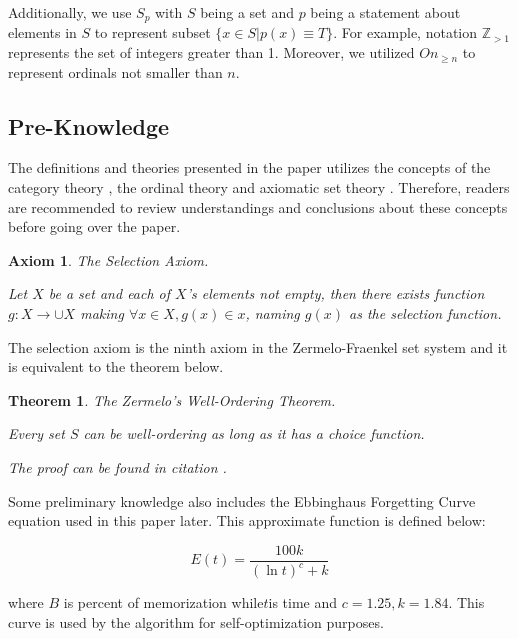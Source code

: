 \documentclass{aims}
\numberwithin{equation}{section}
\newtheorem{theorem}{Theorem}	%
\newtheorem{axiom}{Axiom}	%
\numberwithin{theorem}{section}	%
\numberwithin{axiom}{section}	%
\numberwithin{definition}{section}	%
\begin{document}
	Additionally, we use \(S_p\) with \(S\) being a set and \(p\) being a statement about elements in \(S\) to represent subset \(\{x\in S|p(x)\equiv T\}\). For example, notation \(\mathbb{Z}_{>1}\) represents the set of integers greater than 1. Moreover, we utilized \(On_{\geq n}\) to represent ordinals not smaller than \(n\).
	
	\subsection{Pre-Knowledge}
	
	The definitions and theories presented in the paper utilizes the concepts of the category theory \cite{Li2019}, the ordinal theory \cite{Li2019} and axiomatic set theory \cite{Li2019}. Therefore, readers are recommended to review understandings and conclusions about these concepts before going over the paper.
	
	\begin{axiom}
		The Selection Axiom.
		
		Let \(X\) be a set and each of \(X\){'}s elements not empty, then there exists function \(g:X\to \cup X\) making \(\forall x\in X,g(x)\in x\), naming \(g(x)\) as the selection function.
	\end{axiom}
	
	The selection axiom is the ninth axiom in the Zermelo-Fraenkel set system and it is equivalent to the theorem below.
	
	\begin{theorem}
		The Zermelo{'}s Well-Ordering Theorem.\cite{Li2019}
		
		Every set \(S\) can be well-ordering as long as it has a choice function.
		
		The proof can be found in citation \cite{Li2019}.
	\end{theorem}
	
	Some preliminary knowledge also includes the Ebbinghaus Forgetting Curve equation \cite{Ebbinghaus1913} used in this paper later. This approximate function is defined below:
	
	\begin{equation*}
		E(\mathit{t})=\frac{100 k}{(\ln  t)^c+k}
	\end{equation*}
	
	\noindent where \(B\) is percent of memorization while\(t\)is time and \(c=1.25,k=1.84\). This curve is used by the algorithm for self-optimization purposes.
	
\end{document}
